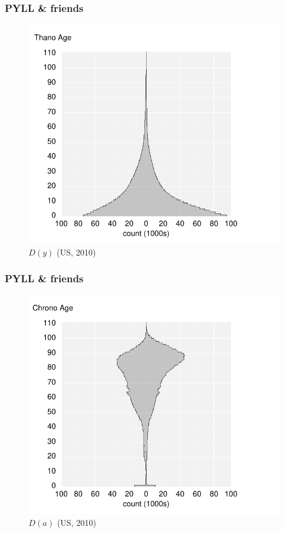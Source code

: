\documentclass{beamer}
\begin{document}
\begin{frame}
\frametitle{PYLL \& friends}
\vspace{-1cm}
\begin{figure}[b]
    \centering
    \includegraphics[scale=.7]{Figures/f2_Dy.pdf}
    \caption{$D(y)$ (US, 2010)}
\end{figure} 
\end{frame}
\begin{frame}
\frametitle{PYLL \& friends}
\vspace{-1cm}
\begin{figure}[b]
    \centering
    \includegraphics[scale=.7]{Figures/f3_Da.pdf}
    \caption{$D(a)$ (US, 2010)}
\end{figure} 
\end{frame}
\end{document}
